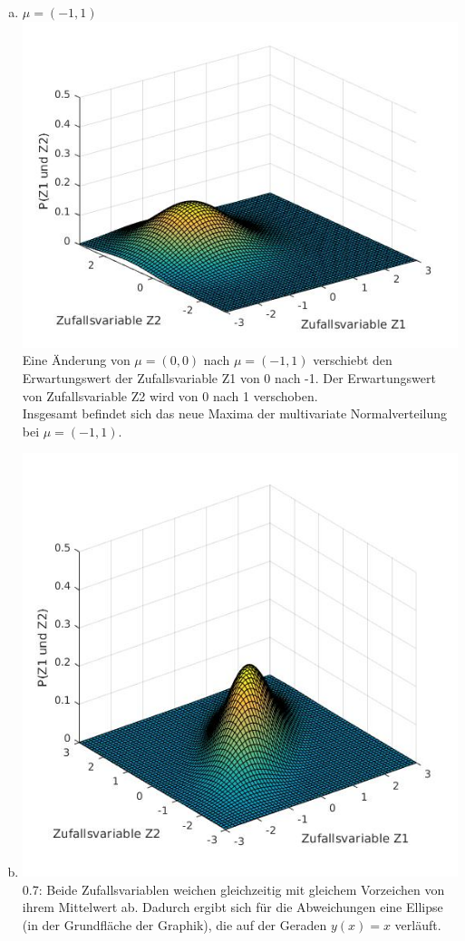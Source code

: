 \documentclass[a4paper]{scrartcl}
\begin{document}
\begin{enumerate}[a)]
	\item $\mu= (-1,1)$\\
	\includegraphics[width=.6\textwidth]{plots/3a_mu_1_1.jpg}\\
	Eine Änderung von $\mu=(0,0)$ nach $\mu=(-1,1)$ verschiebt den Erwartungswert der Zufallsvariable Z1 von 0 nach -1. Der Erwartungswert von Zufallsvariable Z2 wird von 0 nach 1 verschoben.\\
	Insgesamt befindet sich das neue Maxima der multivariate Normalverteilung bei $\mu=(-1,1)$.\\
	
	\item 
	\includegraphics[width=.6\textwidth]{plots/3b_cov07.jpg}\\
	0.7: Beide Zufallsvariablen weichen gleichzeitig mit gleichem Vorzeichen von ihrem Mittelwert ab. Dadurch ergibt sich für die Abweichungen eine Ellipse (in der Grundfläche der Graphik), die auf der Geraden $y(x)=x$ verläuft.\\
	

\end{enumerate}
\end{document}
